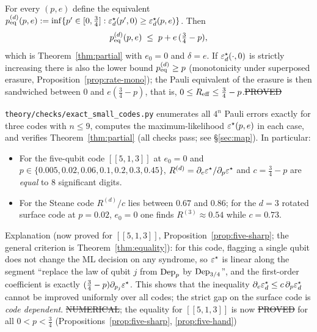 \begin{corollary}\label{cor:worth}
For every $(p,e)$ define the equivalent $p_{\rm eq}^{(d)}(p,e):=\inf\{p'\in[0,\tfrac34]:\varepsilon^{\star}_d(p',0)\ge\varepsilon^{\star}_d(p,e)\}$. Then
\[
p_{\rm eq}^{(d)}(p,e)\;\le\;p+e\,(\tfrac34-p),
\]
which is Theorem~\ref{thm:partial} with $e_0=0$ and $\delta=e$. If $\varepsilon^{\star}_d(\cdot,0)$ is strictly increasing there is also the lower bound $p_{\rm eq}^{(d)}\ge p$
(monotonicity under superposed erasure, Proposition~\ref{prop:rate-mono}); the Pauli equivalent of the erasure is then sandwiched between $0$ and $e(\tfrac34-p)$,
that is, $0\le R_{\rm eff}\le\tfrac34-p$.\hfill\st{PROVED}
\end{corollary}

\begin{observation}\label{obs:sharp}
\texttt{theory/checks/exact\_small\_codes.py} enumerates all $4^n$ Pauli errors exactly for three codes with $n\le9$, computes the maximum-likelihood
$\varepsilon^{\star}(p,e)$ in each case, and verifies Theorem~\ref{thm:partial} (all checks pass; see \S\ref{sec:map}). In particular:
\begin{itemize}
\item For the five-qubit code $[[5,1,3]]$ at $e_0=0$ and $p\in\{0.005,0.02,0.06,0.1,0.2,0.3,0.45\}$,
$R^{(d)}=\partial_e\varepsilon^{\star}/\partial_p\varepsilon^{\star}$ and $c=\tfrac34-p$ are \emph{equal} to 8 significant digits.
\item For the Steane code $R^{(d)}/c$ lies between $0.67$ and $0.86$; for the $d=3$ rotated surface code at $p=0.02$, $e_0=0$ one finds $R^{(3)}\approx0.54$ while $c=0.73$.
\end{itemize}
Explanation (now proved for $[[5,1,3]]$, Proposition~\ref{prop:five-sharp}; the general criterion is Theorem~\ref{thm:equality}): for this code, flagging a single qubit does not change the ML decision on any syndrome, so $\varepsilon^{\star}$ is linear along the segment ``replace the law of qubit $j$ from
$\mathrm{Dep}_p$ by $\mathrm{Dep}_{3/4}$'', and the first-order coefficient is exactly $(\tfrac34-p)\partial_{p_j}\varepsilon^{\star}$.
This shows that the inequality $\partial_e\varepsilon^{\star}_d\le c\,\partial_p\varepsilon^{\star}_d$ cannot be improved uniformly over all codes; the strict gap on the surface code is \emph{code dependent}.
\hfill\st{NUMERICAL}; the equality for $[[5,1,3]]$ is now \st{PROVED} for all $0<p<\tfrac34$ (Propositions~\ref{prop:five-sharp}, \ref{prop:five-hand})
\end{observation}

